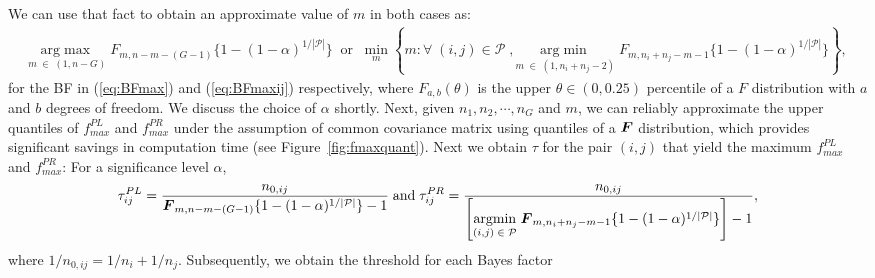 \documentclass[times,sort&compress,3p]{elsarticle}
\theoremstyle{plain}%
\theoremstyle{definition}
\def\be{\begin{eqnarray}}
\def\ee{\end{eqnarray}}
\newcommand{\uF}       {\mbox{\boldmath$F$}}
\newcommand{\ugamma}            {\mbox{\boldmath$\gamma$}}
\begin{document}
We can use that fact to obtain an approximate value of $m$ in both cases as:
\be
 \underset{m\; \in\; (1, n-G)}{\mathrm{arg\max}}\; F_{m, n -m -(G-1)}\{1-(1 - \alpha)^{1/|\mathcal{P}|}\}\;\; \mbox{or}\;\; \underset{m}{\mathrm{\min}} \left\{m:\forall\;(i,j) \in\mathcal{P}\;,  \underset{m\; \in \;(1, n_i+n_{j}-2)}{\mathrm{arg\min}}\; F_{m, n_i+n_j -m -1}\{1 - (1 - \alpha)^{1/|\mathcal{P}|}\} \right\}, \label{eq:mval} 
 \ee
for the BF in (\ref{eq:BFmax}) and (\ref{eq:BFmaxij}) respectively, where $F_{a, b}(\theta)$ is the upper $\theta \in (0, 0.25)$ percentile of a $F$ distribution with $a$ and $b$ degrees of freedom. We discuss the choice of $\alpha$ shortly.
Next, given $n_1,n_2, \cdots, n_{G}$ and $m$, we can reliably approximate the upper quantiles of $f^{PL}_{max}$ and $f^{PR}_{max}$ under the assumption of common covariance matrix using quantiles of a $\uF$ distribution, which provides significant savings in computation time (see Figure~\ref{fig:fmaxquant}). Next we obtain $\tau$ for the pair $(i, j)$ that yield the maximum $f^{PL}_{max}$ and $f^{PR}_{max}$: For a significance level $\alpha$,
\be
\tau^{PL}_{ij} = \frac{n_{0,ij}}{\uF_{m, n -m -(G-1)}\{1-(1-\alpha)^{1/|\mathcal{P}|}\} - 1}\; \mbox{and}\; \tau^{PR}_{ij} = \frac{n_{0,ij}}{\left[\underset{(i,j)\; \in\; \mathcal{P}}{\mathrm{argmin}}\; \uF_{m, n_{i}+n_{j} -m -1}\{1-(1-\alpha)^{1/|\mathcal{P}|}\}\right] - 1} , \label{eq:tau0}
\ee
where $1/n_{0,ij} = 1/n_{i} + 1/n_{j}$. %
Subsequently, we obtain the threshold for each Bayes factor
\end{document}
